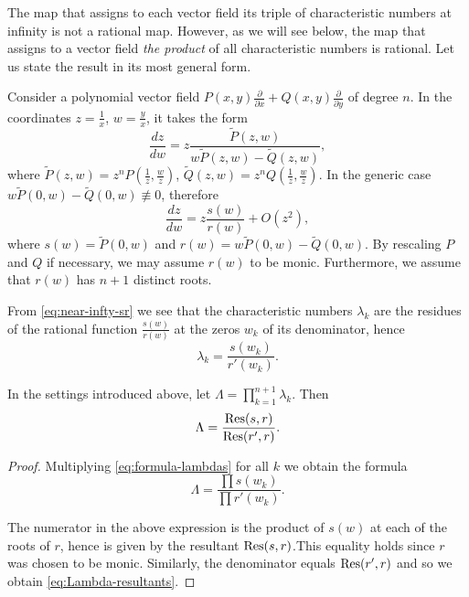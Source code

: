 \documentclass[phd,tocprelim]{cornell}
\begin{document}
The map that assigns to each vector field its triple of characteristic numbers at infinity is not a rational map. However, as we will see below, the map that assigns to a vector field \textit{the product} of all characteristic numbers is rational. Let us state the result in its most general form.

Consider a polynomial vector field $P(x, y)\frac{\partial}{\partial x}+Q(x, y)\frac{\partial}{\partial y}$ of degree $n$.
In the coordinates $z=\frac 1x$, $w=\frac yx$, it takes the form
\begin{equation*}
 \frac{dz}{dw}=z\frac{\tilde P(z, w)}{w\tilde P(z, w) - \tilde Q(z, w)},
\end{equation*}
where $\tilde P(z, w)=z^nP\left( \frac 1z, \frac wz \right)$, $\tilde Q(z, w)=z^nQ\left( \frac 1z, \frac wz \right)$.
In the generic case $w\tilde P(0, w)-\tilde Q(0, w)\not\equiv 0$, therefore
\begin{equation} \label{eq:near-infty-sr}
 \frac{dz}{dw}=z\frac{s(w)}{r(w)}+O(z^2),
\end{equation}
where $s(w)=\tilde P(0, w)$ and $r(w)=w\tilde P(0, w)-\tilde Q(0, w)$. By rescaling $P$ and $Q$ if necessary, we may assume $r(w)$ to be monic. Furthermore, we assume that $r(w)$ has $n+1$ distinct roots.

From \eqref{eq:near-infty-sr} we see that the characteristic numbers $\lambda_k$ are the residues of the rational function $\frac{s(w)}{r(w)}$ at the zeros $w_k$ of its denominator, hence
\begin{equation} \label{eq:formula-lambdas}
 \lambda_k=\frac{s(w_k)}{r'(w_k)}.
\end{equation}

\begin{lemma} \label{lemma:Lambda-resultants}
 In the settings introduced above, let $\Lambda=\prod_{k=1}^{n+1}\lambda_k$.
 Then
 \begin{equation} \label{eq:Lambda-resultants}
  \Lambda=\frac{\operatorname{Res}(s, r)}{\operatorname{Res}(r', r)}.
 \end{equation}
\end{lemma}

\begin{proof}
 Multiplying \eqref{eq:formula-lambdas} for all $k$ we obtain the formula
 \[
  \Lambda = \frac{\prod s(w_k)}{\prod r'(w_k)}.
 \]

 The numerator in the above expression is the product of $s(w)$ at each of the roots of $r$, hence is given by the resultant $\operatorname{Res}(s,r)$.This equality holds since $r$ was chosen to be monic. Similarly, the denominator equals $\operatorname{Res}(r',r)$ and so we obtain \eqref{eq:Lambda-resultants}.
\end{proof}
\end{document}
